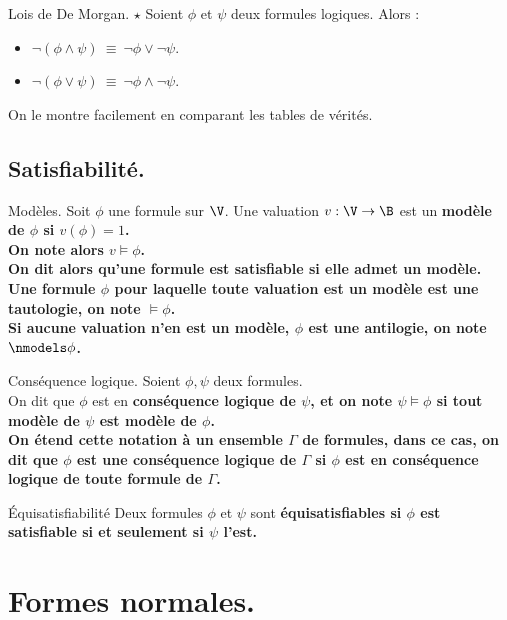\documentclass[french, 11pt]{article}
\begin{document}
\begin{prop}{Lois de De Morgan. $\star$}{}
    Soient $\phi$ et $\psi$ deux formules logiques. Alors :
    \begin{itemize}[topsep=0pt,itemsep=-0.9 ex]
        \item $\lnot(\phi\land\psi) ~ \equiv ~ \lnot\phi\lor\lnot\psi$.
        \item $\lnot(\phi\lor\psi) ~ \equiv ~ \lnot\phi\land\lnot\psi$.
    \end{itemize}
    \tcblower
    On le montre facilement en comparant les tables de vérités.
\end{prop}

\subsection{Satisfiabilité.}

\begin{defi}{Modèles.}{}
    Soit $\phi$ une formule sur $\V$. Une valuation $v:\V\to\B$ est un \bf{modèle} de $\phi$ si $v(\phi)=1$.\\
    On note alors $v\models\phi$.\\
    On dit alors qu'une formule est \bf{satisfiable} si elle admet un modèle.\n
    Une formule $\phi$ pour laquelle toute valuation est un modèle est une tautologie, on note $\models\phi$.\\
    Si aucune valuation n'en est un modèle, $\phi$ est une antilogie, on note $\nmodels\phi$.
\end{defi}

\begin{defi}{Conséquence logique.}{}
    Soient $\phi,\psi$ deux formules.\\
    On dit que $\phi$ est en \bf{conséquence logique} de $\psi$, et on note $\psi\models\phi$ si tout modèle de $\psi$ est modèle de $\phi$.\\
    On étend cette notation à un ensemble $\Gamma$ de formules, dans ce cas, on dit que $\phi$ est une \bf{conséquence logique} de $\Gamma$ si $\phi$ est en \bf{conséquence logique} de toute formule de $\Gamma$.
\end{defi}

\begin{defi}{Équisatisfiabilité}{}
    Deux formules $\phi$ et $\psi$ sont \bf{équisatisfiables} si $\phi$ est satisfiable si et seulement si $\psi$ l'est.
\end{defi}

\section{Formes normales.}
\end{document}
